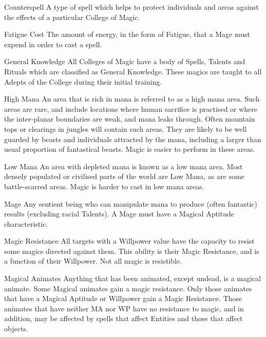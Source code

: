 \begin{multicols*}{3}
\begin{Description}
\item[Counterspell] A type of spell which helps to protect
individuals and areas against the effects of a particular College of
Magic.

\item[Fatigue Cost] The amount of energy, in the form of Fatigue, that
a Mage must expend in order to cast a spell.

\item[General Knowledge] All Colleges of Magic have a body of Spells,
Talents and Rituals which are classified as General Knowledge. These
magics are taught to all Adepts of the College during their initial
training.

\item[High Mana] An area that is rich in mana is referred to as a high
mana area. Such areas are rare, and include locations where human
sacrifice is practised or where the inter-planar boundaries are weak,
and mana leaks through. Often mountain tops or clearings in jungles
will contain such areas. They are likely to be well guarded by beasts
and individuals attracted by the mana, including a larger than usual
proportion of fantastical beasts. Magic is easier to perform in these
areas.

\item[Low Mana] An area with depleted mana is known as a low mana
area. Most densely populated or civilised parts of the world are Low
Mana, as are some battle-scarred areas. Magic is harder to cast in low
mana areas.

\item[Mage] Any sentient being who can manipulate mana to produce
(often fantastic) results (excluding racial Talents). A Mage must have
a Magical Aptitude characteristic.

\item[Magic Resistance] All targets with a Willpower value have the
capacity to resist some magics directed against them. This ability is
their Magic Resistance, and is a function of their Willpower. Not all
magic is resistible.

\item[Magical Animates] Anything that has been animated, except
undead, is a magical animate. Some Magical animates gain a magic
resistance.  Only those animates that have a Magical Aptitude or
Willpower gain a Magic Resistance.  Those animates that have neither
MA nor WP have no resistance to magic, and in addition, may be
affected by spells that affect Entities and those that affect
objects.


\end{Description}
\end{multicols*}
